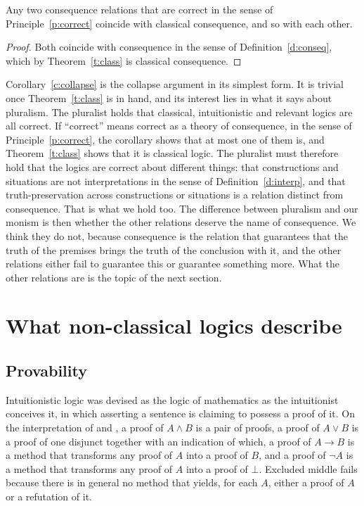 \documentclass{situationist-preprint}
\begin{document}
\begin{corollary}\label{c:collapse}
Any two consequence relations that are correct in the sense of Principle~\ref{p:correct} coincide with classical consequence, and so with each other.
\end{corollary}

\begin{proof}
Both coincide with consequence in the sense of Definition~\ref{d:conseq}, which by Theorem~\ref{t:class} is classical consequence.
\end{proof}

Corollary~\ref{c:collapse} is the collapse argument in its simplest form. It is trivial once Theorem~\ref{t:class} is in hand, and its interest lies in what it says about pluralism. The pluralist holds that classical, intuitionistic and relevant logics are all correct. If \enquote{correct} means correct as a theory of consequence, in the sense of Principle~\ref{p:correct}, the corollary shows that at most one of them is, and Theorem~\ref{t:class} shows that it is classical logic. The pluralist must therefore hold that the logics are correct about different things: that constructions and situations are not interpretations in the sense of Definition~\ref{d:interp}, and that truth-preservation across constructions or situations is a relation distinct from consequence. That is what we hold too. The difference between pluralism and our monism is then whether the other relations deserve the name of consequence. We think they do not, because consequence is the relation that guarantees that the truth of the premises brings the truth of the conclusion with it, and the other relations either fail to guarantee this or guarantee something more. What the other relations are is the topic of the next section.

\section{What non-classical logics describe}\label{s:noncl}

\subsection{Provability}

Intuitionistic logic was devised as the logic of mathematics as the intuitionist conceives it, in which asserting a sentence is claiming to possess a proof of it. On the interpretation of \citet{Heyting1930} and \citet{Kolmogorov1932}, a proof of $A \wedge B$ is a pair of proofs, a proof of $A \vee B$ is a proof of one disjunct together with an indication of which, a proof of $A \to B$ is a method that transforms any proof of $A$ into a proof of $B$, and a proof of $\neg A$ is a method that transforms any proof of $A$ into a proof of $\bot$. Excluded middle fails because there is in general no method that yields, for each $A$, either a proof of $A$ or a refutation of it.
\end{document}

